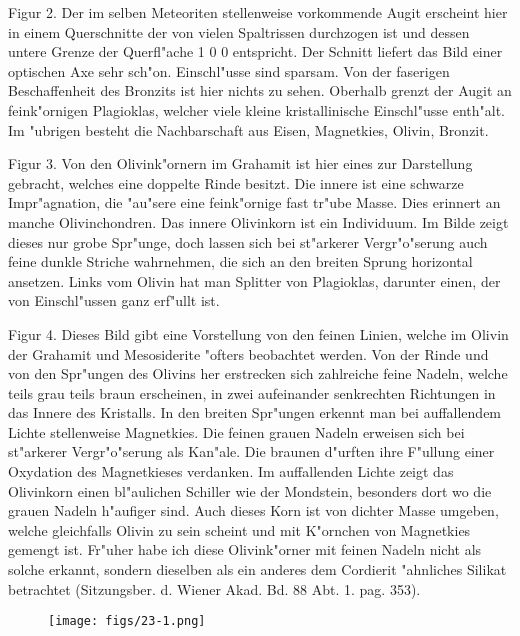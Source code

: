 \documentclass[a4paper, 11pt, oneside, polutonikogreek, german]{article}
\begin{document}
Figur 2. Der im selben Meteoriten stellenweise vorkommende Augit erscheint hier in einem Querschnitte der von vielen Spaltrissen durchzogen ist und dessen untere Grenze der Querfl"ache 1 0 0 entspricht. Der Schnitt liefert das Bild einer optischen Axe sehr sch"on. Einschl"usse sind sparsam. Von der faserigen Beschaffenheit des Bronzits ist hier nichts zu sehen. Oberhalb grenzt der Augit an feink"ornigen Plagioklas, welcher viele kleine kristallinische Einschl"usse enth"alt. Im "ubrigen besteht die Nachbarschaft aus Eisen, Magnetkies, Olivin, Bronzit.

Figur 3. Von den Olivink"ornern im Grahamit ist hier eines zur Darstellung gebracht, welches eine doppelte Rinde besitzt. Die innere ist eine schwarze Impr"agnation, die "au"sere eine feink"ornige fast tr"ube Masse. Dies erinnert an manche Olivinchondren. Das innere Olivinkorn ist ein Individuum. Im Bilde zeigt dieses nur grobe Spr"unge, doch lassen sich bei st"arkerer Vergr"o"serung auch feine dunkle Striche wahrnehmen, die sich an den breiten Sprung horizontal ansetzen. Links vom Olivin hat man Splitter von Plagioklas, darunter einen, der von Einschl"ussen ganz erf"ullt ist.

Figur 4. Dieses Bild gibt eine Vorstellung von den feinen Linien, welche im Olivin der Grahamit und Mesosiderite "ofters beobachtet werden. Von der Rinde und von den Spr"ungen des Olivins her erstrecken sich zahlreiche feine Nadeln, welche teils grau teils braun erscheinen, in zwei aufeinander senkrechten Richtungen in das Innere des Kristalls. In den breiten Spr"ungen erkennt man bei auffallendem Lichte stellenweise Magnetkies. Die feinen grauen Nadeln erweisen sich bei st"arkerer Vergr"o"serung als Kan"ale. Die braunen d"urften ihre F"ullung einer Oxydation des Magnetkieses verdanken. Im auffallenden Lichte zeigt das Olivinkorn einen bl"aulichen Schiller wie der Mondstein, besonders dort wo die grauen Nadeln h"aufiger sind. Auch dieses Korn ist von dichter Masse umgeben, welche gleichfalls Olivin zu sein scheint und mit K"ornchen von Magnetkies gemengt ist. Fr"uher habe ich diese Olivink"orner mit feinen Nadeln nicht als solche erkannt, sondern dieselben als ein anderes dem Cordierit "ahnliches Silikat betrachtet (Sitzungsber. d. Wiener Akad. Bd. 88 Abt. 1. pag. 353).
\clearpage

\vspace*{\fill}
\begin{figure}[H]
\centering
\texttt{[image: figs/23-1.png]}
\caption{}
\end{figure}
\vspace*{\fill}
\clearpage
\end{document}
